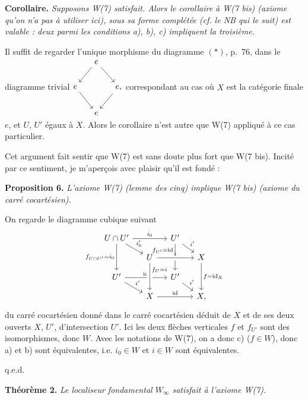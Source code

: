 \documentclass[11pt]{article}
\newcommand{\printedpage}[1]{\marginpar{\footnotesize p.~#1}}
\newcommand{\msp}[1]{\marginpar{\footnotesize [#1]}}
\begin{document}
\textbf{Corollaire.} \textit{Supposons \textup{W(7)} satisfait. Alors le corollaire à \textup{W(7 bis)} (axiome qu'on n'a pas à utiliser ici), sous sa forme complétée (cf. le NB qui le suit) est valable : deux parmi les conditions a), b), c) impliquent la troisième.}

Il suffit de regarder l'unique morphisme du diagramme $(*)$, p.~76, dans le diagramme trivial\quad $\vcenter{\hbox{\begin{tikzcd}[column sep=small]
& e \arrow[dl] \arrow[dr] & \\
e \arrow[dr] & & e, \arrow[dl] \\
& e &
\end{tikzcd}}}$\quad correspondant au cas où $X$ est la catégorie finale $e$, et $U$, $U'$ égaux à $X$. Alors le corollaire n'est autre que W(7) appliqué à ce cas particulier.

Cet argument fait sentir que W(7) est sans doute plus fort que W(7 bis). Incité par ce sentiment, je m'aperçois avec plaisir qu'il est fondé :

\printedpage{57}

\msp{page 78}
\textbf{Proposition 6.} \textit{L'axiome \textup{W(7)} (lemme des cinq) implique \textup{W(7 bis)} (axiome du carré cocartésien).}

On regarde le diagramme cubique suivant
\[
\begin{tikzcd}[row sep=small, column sep=small]
U\cap U' \arrow[rr, "i_0"] \arrow[dr, "i'_0"] \arrow[dd, "f_{U\cap U'}=i_0"'] & & U' \arrow[dr, "i'"] \arrow[dd, "f_{U'}=\mathrm{id}"{swap,pos=.25}] & \\
& U \arrow[rr, crossing over, "i"] & & X \arrow[dd, "f=\mathrm{id}_X"] \\
U' \arrow[rr, "\mathrm{id}"] \arrow[dr, "i'"] & & U' \arrow[dr, "i'"] & \\
& X \arrow[rr, "\mathrm{id}"] \arrow[from=uu, crossing over, "f_U=i"{pos=.25}] & & X,
\end{tikzcd}
\]
du carré cocartésien donné dans le carré cocartésien déduit de $X$ et de ses deux ouverts $X$, $U'$, d'intersection $U'$. Ici les deux flèches verticales $f$ et $f_{U'}$ sont des isomorphismes, donc $W$. Avec les notations de W(7), on a donc c) ($f\in W$), donc a) et b) sont équivalentes, i.e. $i_0\in W$ et $i\in W$ sont équivalentes.

\hfill q.e.d.

\textbf{Théorème 2.} \textit{Le localiseur fondamental $W_\infty$ satisfait à l'axiome \textup{W(7)}.}
\end{document}
